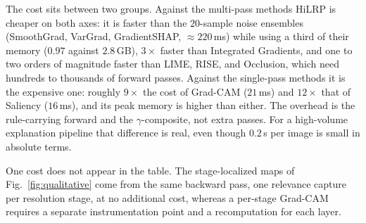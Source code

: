 \documentclass[lettersize,journal]{IEEEtran}
\theoremstyle{definition}
\theoremstyle{plain}
\begin{document}
The cost sits between two groups. Against the multi-pass methods HiLRP is cheaper on both axes: it is faster than the $20$-sample noise ensembles
(SmoothGrad, VarGrad, GradientSHAP, ${\approx}220$\,ms) while using a third of their memory ($0.97$ against $2.8$\,GB), $3\times$ faster than Integrated
Gradients, and one to two orders of magnitude faster than LIME, RISE, and
Occlusion, which need hundreds to thousands of forward passes. Against the
single-pass methods it is the expensive one: roughly $9\times$ the cost of
Grad-CAM ($21$\,ms) and $12\times$ that of Saliency ($16$\,ms), and its peak
memory is higher than either. The overhead is the rule-carrying forward and the
$\gamma$-composite, not extra passes. For a high-volume explanation pipeline
that difference is real, even though $0.2$\,s per image is small in absolute
terms.

One cost does not appear in the table. The stage-localized maps of
Fig.~\ref{fig:qualitative} come from the same backward pass, one relevance
capture per resolution stage, at no additional cost, whereas a per-stage
Grad-CAM requires a separate instrumentation point and a recomputation for each layer.
\end{document}
